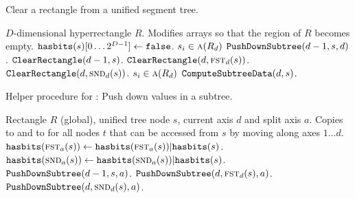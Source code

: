 \documentclass[english,gradu]{tktltiki2018}
\begin{document}
\begin{algorithm}
\caption{Clear a rectangle from a unified segment tree.}\label{alg:segurm}
\begin{algorithmic}
\Require $D$-dimensional hyperrectangle $R$.
\Ensure Modifies \hasbita{} arrays so that the region of $R$ becomes empty.
		\State \Return
	\EndIf
		\State $\texttt{hasbits}(s)[0\dots 2^{D-1}]\gets\texttt{false}$.
		\State \Return
	\EndIf
		\Comment $s_i\in\textsc{a}(R_d)$
		\State $\texttt{PushDownSubtree}(d-1,s,d)$.
	\EndIf
	\State $\texttt{ClearRectangle}(d-1,s)$.
		\State $\texttt{ClearRectangle}(d,\textsc{fst}_{d}(s))$.
		\State $\texttt{ClearRectangle}(d,\textsc{snd}_{d}(s))$.
	\EndIf
		\Comment $s_i\in\textsc{a}(R_d)$
		\State $\texttt{ComputeSubtreeData}(d,s)$.
	\EndIf
\EndProcedure
\end{algorithmic}
\end{algorithm}

\begin{algorithm}
\caption{Helper procedure for \cleardt: Push down values in a subtree.}\label{alg:segurm:pdst}
\begin{algorithmic}
\Require Rectangle $R$ (global), unified tree node $s$, current axis $d$ and split axis $a$.
\Ensure Copies  to  and to  for all nodes $t$ that can be accessed from $s$ by moving along axes $1\dots d$.
		\State $\texttt{hasbits}(\textsc{fst}_{a}(s))\gets \texttt{hasbits}(\textsc{fst}_{a}(s)) | \texttt{hasbits}(s)$.
		\State $\texttt{hasbits}(\textsc{snd}_{a}(s))\gets \texttt{hasbits}(\textsc{snd}_{a}(s)) | \texttt{hasbits}(s)$.
		\State \Return
		\State \Return
	\EndIf
	\State $\texttt{PushDownSubtree}(d-1,s,a)$.
		\State $\texttt{PushDownSubtree}(d,\textsc{fst}_{d}(s),a)$.
		\State $\texttt{PushDownSubtree}(d,\textsc{snd}_{d}(s),a)$.
	\EndIf
\EndProcedure
\end{algorithmic}
\end{algorithm}
\end{document}

